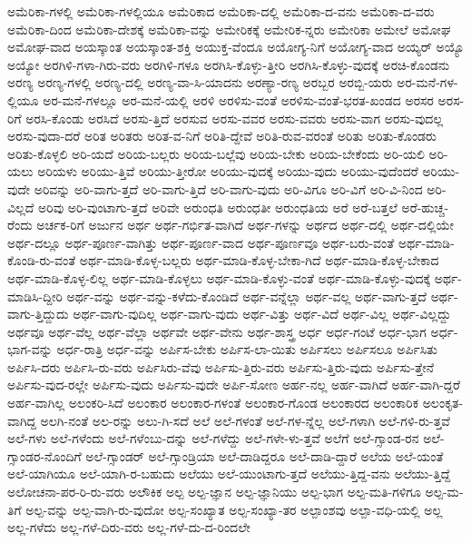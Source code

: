 {ಅಮೆರಿಕಾ-ಗಳಲ್ಲಿ
ಅಮೆರಿಕಾ-ಗಳಲ್ಲಿಯೂ
ಅಮೆರಿಕಾದ
ಅಮೆರಿಕಾ-ದಲ್ಲಿ
ಅಮೆರಿಕಾ-ದ-ವನು
ಅಮೆರಿಕಾ-ದ-ವರು
ಅಮೆರಿಕಾ-ದಿಂದ
ಅಮೆರಿಕಾ-ದೇಶಕ್ಕೆ
ಅಮೆರಿಕಾ-ವನ್ನು
ಅಮೇರಿಕಕ್ಕೆ
ಅಮೇರಿಕ-ನ್ನರು
ಅಮೇರಿಕಾ
ಅಮೇಲೆ
ಅಮೋಘ
ಅಮೋಘ-ವಾದ
ಅಯಸ್ಕಾಂತ
ಅಯಸ್ಕಾಂತ-ಶಕ್ತಿ
ಅಯುಕ್ತ-ವೆಂದೂ
ಅಯೋಗ್ಯ-ನಿಗೆ
ಅಯೋಗ್ಯ-ವಾದ
ಅಯ್ಯರ್
ಅಯ್ಯೊ
ಅಯ್ಯೋ
ಅರಗಿಳಿ-ಗಳಾ-ಗಿರು-ವರು
ಅರಗಿಳಿ-ಗಳೂ
ಅರಗಿಸಿ-ಕೊಳ್ಳು-ತ್ತೀರಿ
ಅರಗಿಸಿ-ಕೊಳ್ಳು-ವುದಕ್ಕೆ
ಅರಚಿ-ಕೊಂಡನು
ಅರಣ್ಯ
ಅರಣ್ಯ-ಗಳಲ್ಲಿ
ಅರಣ್ಯ-ದಲ್ಲಿ
ಅರಣ್ಯ-ವಾ-ಸಿ-ಯಾದನು
ಅರಣ್ಯಾ-ರಣ್ಯ
ಅರಬ್ಬರ
ಅರಬ್ಬಿ-ಯರು
ಅರ-ಮನೆ-ಗಳ-ಲ್ಲಿಯೂ
ಅರ-ಮನೆ-ಗಳಲ್ಲೂ
ಅರ-ಮನೆ-ಯಲ್ಲಿ
ಅರಳಿ
ಅರಳಿಸು-ವಂತೆ
ಅರಳಿಸು-ವಂತೆ-ಭರತ-ಖಂಡದ
ಅರಸರ
ಅರಸ-ರಿಗೆ
ಅರಸಿ-ಕೊಂಡು
ಅರಸಿದೆ
ಅರಸು-ತ್ತಿದೆ
ಅರಸುವ
ಅರಸು-ವವರ
ಅರಸು-ವವರು
ಅರಸು-ವಾಗ
ಅರಸು-ವುದಲ್ಲ
ಅರಸು-ವುದಾ-ದರೆ
ಅರಿತ
ಅರಿತರು
ಅರಿತ-ವ-ನಿಗೆ
ಅರಿತಿ-ದ್ದೇವೆ
ಅರಿತಿ-ರುವ-ವರಂತೆ
ಅರಿತು
ಅರಿತು-ಕೊಂಡರು
ಅರಿತು-ಕೊಳ್ಳಲಿ
ಅರಿ-ಯದೆ
ಅರಿಯ-ಬಲ್ಲರು
ಅರಿಯ-ಬಲ್ಲೆವು
ಅರಿಯ-ಬೇಕು
ಅರಿಯ-ಬೇಕೆಂದು
ಅರಿ-ಯಲಿ
ಅರಿ-ಯಲು
ಅರಿಯಳು
ಅರಿಯು-ತ್ತಿವೆ
ಅರಿಯು-ತ್ತೀರೋ
ಅರಿಯು-ವುದಕ್ಕೆ
ಅರಿಯು-ವುದು
ಅರಿಯು-ವುದೆಂದರೆ
ಅರಿಯು-ವುದೇ
ಅರಿವನ್ನು
ಅರಿ-ವಾಗು-ತ್ತದೆ
ಅರಿ-ವಾಗು-ತ್ತಿದೆ
ಅರಿ-ವಾಗು-ವುದು
ಅರಿ-ವಿಗೂ
ಅರಿ-ವಿಗೆ
ಅರಿ-ವಿ-ನಿಂದ
ಅರಿ-ವಿಲ್ಲದೆ
ಅರಿವು
ಅರಿ-ವುಂಟಾಗು-ತ್ತದೆ
ಅರಿವೇ
ಅರುಂಧತಿ
ಅರುಂಧತೀ
ಅರುಂಧತಿಯ
ಅರೆ
ಅರೆ-ಬತ್ತಲೆ
ಅರೆ-ಹುಚ್ಚ-ರೆಂದು
ಅರ್ಚಕ-ರಿಗೆ
ಅರ್ಜುನ
ಅರ್ಥ
ಅರ್ಥ-ಗರ್ಭಿತ-ವಾಗಿದೆ
ಅರ್ಥ-ಗಳನ್ನು
ಅರ್ಥದ
ಅರ್ಥ-ದಲ್ಲಿ
ಅರ್ಥ-ದಲ್ಲಿಯೇ
ಅರ್ಥ-ದಲ್ಲೂ
ಅರ್ಥ-ಪೂರ್ಣ-ವಾಗಿತ್ತು
ಅರ್ಥ-ಪೂರ್ಣ-ವಾದ
ಅರ್ಥ-ಪೂರ್ಣವೂ
ಅರ್ಥ-ಬರು-ವಂತೆ
ಅರ್ಥ-ಮಾಡಿ-ಕೊಂಡಿ-ರು-ವಂತೆ
ಅರ್ಥ-ಮಾಡಿ-ಕೊಳ್ಳ-ಬಲ್ಲರು
ಅರ್ಥ-ಮಾಡಿ-ಕೊಳ್ಳ-ಬೇಕಾ-ಗಿದೆ
ಅರ್ಥ-ಮಾಡಿ-ಕೊಳ್ಳ-ಬೇಕಾದ
ಅರ್ಥ-ಮಾಡಿ-ಕೊಳ್ಳ-ಲಿಲ್ಲ
ಅರ್ಥ-ಮಾಡಿ-ಕೊಳ್ಳಲು
ಅರ್ಥ-ಮಾಡಿ-ಕೊಳ್ಳು-ವಂತೆ
ಅರ್ಥ-ಮಾಡಿ-ಕೊಳ್ಳು-ವುದಕ್ಕೆ
ಅರ್ಥ-ಮಾಡಿಸಿ-ದ್ದೀರಿ
ಅರ್ಥ-ವನ್ನು
ಅರ್ಥ-ವನ್ನು-ಕಳೆದು-ಕೊಂಡಿದೆ
ಅರ್ಥ-ವನ್ನೆಲ್ಲಾ
ಅರ್ಥ-ವಲ್ಲ
ಅರ್ಥ-ವಾಗು-ತ್ತದೆ
ಅರ್ಥ-ವಾಗು-ತ್ತಿದ್ದುದು
ಅರ್ಥ-ವಾಗು-ವುದಿಲ್ಲ
ಅರ್ಥ-ವಾಗು-ವುದು
ಅರ್ಥ-ವಿತ್ತು
ಅರ್ಥ-ವಿದೆ
ಅರ್ಥ-ವಿಲ್ಲ
ಅರ್ಥ-ವಿಲ್ಲದ್ದು
ಅರ್ಥವೂ
ಅರ್ಥ-ವೆಲ್ಲ
ಅರ್ಥ-ವೆಲ್ಲಾ
ಅರ್ಥವೇ
ಅರ್ಥ-ವೇನು
ಅರ್ಥ-ಶಾಸ್ತ್ರ
ಅರ್ಧ
ಅರ್ಧ-ಗಂಟೆ
ಅರ್ಧ-ಭಾಗ
ಅರ್ಧ-ಭಾಗ-ವನ್ನು
ಅರ್ಧ-ರಾತ್ರಿ
ಅರ್ಧ-ವನ್ನು
ಅರ್ಪಿಸ-ಬೇಕು
ಅರ್ಪಿಸ-ಲಾ-ಯಿತು
ಅರ್ಪಿಸಲು
ಅರ್ಪಿಸಲೂ
ಅರ್ಪಿಸಿತು
ಅರ್ಪಿಸಿ-ದರು
ಅರ್ಪಿಸಿ-ರು-ವರು
ಅರ್ಪಿಸಿರು-ವೆವು
ಅರ್ಪಿಸು-ತ್ತಿರು-ವರು
ಅರ್ಪಿಸು-ತ್ತಿರು-ವುದು
ಅರ್ಪಿಸು-ತ್ತೇನೆ
ಅರ್ಪಿಸು-ವುದ-ರಲ್ಲೇ
ಅರ್ಪಿಸು-ವುದು
ಅರ್ಪಿಸು-ವುದೇ
ಅರ್ಪಿ-ಸೋಣ
ಅರ್ಹ-ನಲ್ಲ
ಅರ್ಹ-ವಾಗಿದೆ
ಅರ್ಹ-ವಾಗಿ-ದ್ದರೆ
ಅರ್ಹ-ವಾಗಿಲ್ಲ
ಅಲಂಕರಿ-ಸಿದೆ
ಅಲಂಕಾರ
ಅಲಂಕಾರ-ಗಳಂತೆ
ಅಲಂಕಾರ-ಗೊಂಡ
ಅಲಂಕಾರದ
ಅಲಂಕಾರಿಕ
ಅಲಂಕೃತ-ವಾಗಿದ್ದ
ಅಲಗಿ-ನಂತೆ
ಅಲ-ರನ್ನು
ಅಲು-ಗಿ-ಸದೆ
ಅಲೆ
ಅಲೆ-ಗಳಂತೆ
ಅಲೆ-ಗಳ-ನ್ನೆಲ್ಲ
ಅಲೆ-ಗಳಾಗಿ
ಅಲೆ-ಗಳಿ-ರು-ತ್ತವೆ
ಅಲೆ-ಗಳು
ಅಲೆ-ಗಳೆಂದು
ಅಲೆ-ಗಳೆಂಬು-ದನ್ನು
ಅಲೆ-ಗಳೆದ್ದು
ಅಲೆ-ಗಳೇ-ಳು-ತ್ತವೆ
ಅಲೆಗೆ
ಅಲೆ-ಗ್ಸಾಂಡ-ರನ
ಅಲೆ-ಗ್ಸಾಂಡರ-ನೊಂದಿಗೆ
ಅಲೆ-ಗ್ಸಾಂಡರ್
ಅಲೆ-ಗ್ಸಾಂಡ್ರಿಯಾ
ಅಲೆ-ದಾಡಿದ್ದರೂ
ಅಲೆ-ದಾಡಿ-ದ್ದಾರೆ
ಅಲೆಯ
ಅಲೆ-ಯಂತೆ
ಅಲೆ-ಯಾಗಿಯೂ
ಅಲೆ-ಯಾಗಿ-ರ-ಬಹುದು
ಅಲೆಯು
ಅಲೆ-ಯುಂಟಾಗು-ತ್ತದೆ
ಅಲೆಯು-ತ್ತಿದ್ದ-ವನು
ಅಲೆಯು-ತ್ತಿದ್ದೆ
ಅಲೋಚನಾ-ಪರ-ರಿ-ರು-ವರು
ಅಲೌಕಿಕ
ಅಲ್ಪ
ಅಲ್ಪ-ಜ್ಞಾನ
ಅಲ್ಪ-ಜ್ಞಾನಿಯು
ಅಲ್ಪ-ಭಾಗ
ಅಲ್ಪ-ಮತಿ-ಗಳಿಗೂ
ಅಲ್ಪ-ಮ-ತಿಗೆ
ಅಲ್ಪ-ವನ್ನು
ಅಲ್ಪ-ವಾಗಿ-ರು-ವುದೋ
ಅಲ್ಪ-ಸಂಖ್ಯಾತ
ಅಲ್ಪ-ಸಂಖ್ಯಾ-ತರ
ಅಲ್ಪಾಂಶವು
ಅಲ್ಪಾ-ವಧಿ-ಯಲ್ಲಿ
ಅಲ್ಲ
ಅಲ್ಲ-ಗಳೆದು
ಅಲ್ಲ-ಗಳೆ-ದಿರು-ವರು
ಅಲ್ಲ-ಗಳೆ-ದು-ದ-ರಿಂದಲೇ
}
